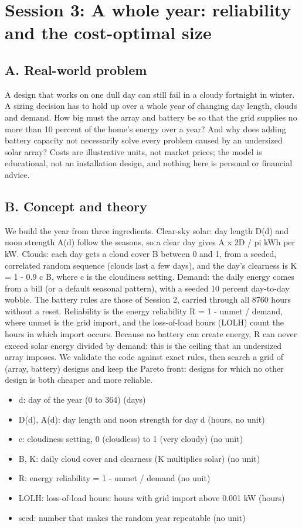 \documentclass[11pt,a4paper]{article}
\begin{document}
\section{Session 3: A whole year: reliability and the cost-optimal size}

\subsection*{A. Real-world problem}
A design that works on one dull day can still fail in a cloudy fortnight in winter. A sizing decision has to hold up over a whole year of changing day length, clouds and demand. How big must the array and battery be so that the grid supplies no more than 10 percent of the home's energy over a year? And why does adding battery capacity not necessarily solve every problem caused by an undersized solar array? Costs are illustrative units, not market prices; the model is educational, not an installation design, and nothing here is personal or financial advice.

\subsection*{B. Concept and theory}
We build the year from three ingredients. Clear-sky solar: day length D(d) and noon strength A(d) follow the seasons, so a clear day gives A x 2D / pi kWh per kW. Clouds: each day gets a cloud cover B between 0 and 1, from a seeded, correlated random sequence (clouds last a few days), and the day's clearness is K = 1 - 0.9 c B, where c is the cloudiness setting. Demand: the daily energy comes from a bill (or a default seasonal pattern), with a seeded 10 percent day-to-day wobble. The battery rules are those of Session 2, carried through all 8760 hours without a reset. Reliability is the energy reliability R = 1 - unmet / demand, where unmet is the grid import, and the loss-of-load hours (LOLH) count the hours in which import occurs. Because no battery can create energy, R can never exceed solar energy divided by demand: this is the ceiling that an undersized array imposes. We validate the code against exact rules, then search a grid of (array, battery) designs and keep the Pareto front: designs for which no other design is both cheaper and more reliable.

\begin{itemize}[nosep]
\item d: day of the year (0 to 364) (days)
\item D(d), A(d): day length and noon strength for day d (hours, no unit)
\item c: cloudiness setting, 0 (cloudless) to 1 (very cloudy) (no unit)
\item B, K: daily cloud cover and clearness (K multiplies solar) (no unit)
\item R: energy reliability = 1 - unmet / demand (no unit)
\item LOLH: loss-of-load hours: hours with grid import above 0.001 kW (hours)
\item seed: number that makes the random year repeatable (no unit)
\end{itemize}
\end{document}
